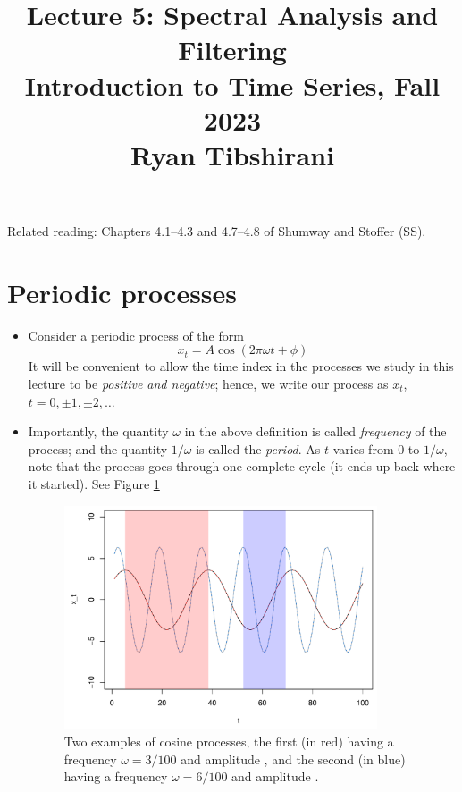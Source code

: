 \documentclass{article}
\title{Lecture 5: Spectral Analysis and Filtering \\ \smallskip  
\large Introduction to Time Series, Fall 2023 \\ \smallskip
Ryan Tibshirani}
\date{}
\begin{document}
\maketitle
\RaggedRight
\vspace{-50pt}

Related reading: Chapters 4.1--4.3 and 4.7--4.8 of Shumway and Stoffer (SS).

\section{Periodic processes}

\begin{itemize}
\item Consider a periodic process of the form 
\begin{equation}
\label{eq:cos-process}
x_t = A \cos(2\pi\omega t + \phi)
\end{equation}
It will be convenient to allow the time index in the processes we study in this
lecture to be \emph{positive and negative}; hence, we write our process as
$x_t$, $t = 0, \pm 1, \pm 2, \dots$ 

\item Importantly, the quantity $\omega$ in the above definition is called 
  \emph{frequency} of the process; and the quantity $1/\omega$ is called the    
  \emph{period}. As $t$ varies from $0$ to $1/\omega$, note that the process
  goes through one complete cycle (it ends up back where it started). See Figure
  \ref{fig:cos-process} 

\begin{figure}[htb]
\centering
\includegraphics[width=0.875\textwidth]{fig/cos-process-1.pdf}
\caption{Two examples of cosine processes, the first (in red) having a frequency  
  $\omega = 3/100$ and amplitude , and the
  second (in blue) having a frequency $\omega = 6/100$ and amplitude
  .} 
\label{fig:cos-process}
\end{figure}


\end{itemize}
\end{document}
